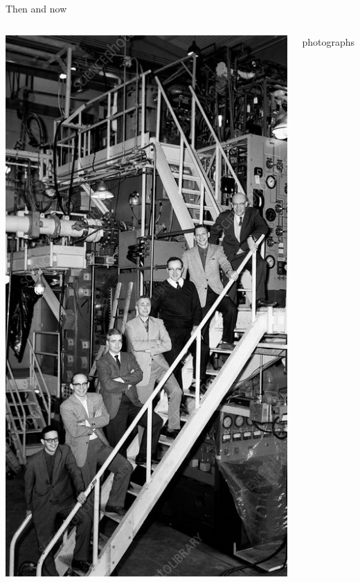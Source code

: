 \documentclass[aspectratio=169]{beamer}
\begin{document}
\begin{frame}{Then and now}
\vspace{0.15 cm}
\begin{columns}
\includegraphics[width=\linewidth]{H4000010-Team_that_discovered_Omega_minus_particle.jpg}

\begin{center}
\begin{columns}
\centering
photographs


\end{columns}
\end{center}
\end{columns}
\end{frame}
\end{document}

